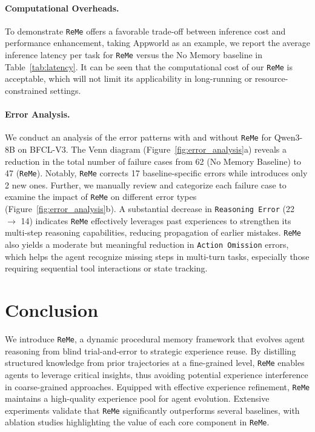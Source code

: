 \documentclass[11pt]{article}
\newcommand{\ours}{\texttt{ReMe}}
\begin{document}
\paragraph{Computational Overheads.}
To demonstrate {\ours} offers a favorable trade-off between inference cost and performance enhancement, taking Appworld as an example, we report the average inference latency per task for {\ours} versus the No Memory baseline in Table~\ref{tab:latency}. 
It can be seen that the computational cost of our {\ours} is acceptable, which will not limit its applicability in long-running or resource-constrained settings. 


\paragraph{Error Analysis.} 
We conduct an analysis of the error patterns with and without {\ours} for Qwen3-8B on BFCL-V3. 
The Venn diagram (Figure~\ref{fig:error_analysis}a) reveals a reduction in the total number of failure cases from 62 (No Memory Baseline) to 47 ({\ours}). 
Notably, {\ours} corrects 17 baseline-specific errors while introduces only 2 new ones. 
Further, we manually review and categorize each failure case to examine the impact of {\ours} on different error types (Figure~\ref{fig:error_analysis}b). 
A substantial decrease in \texttt{Reasoning Error} (22 $\rightarrow$ 14) indicates {\ours} effectively leverages past experiences to strengthen its multi‑step reasoning capabilities, reducing propagation of earlier mistakes. 
{\ours} also yields a moderate but meaningful reduction in \texttt{Action Omission} errors, which helps the agent recognize missing steps in multi-turn tasks, especially those requiring sequential tool interactions or state tracking.


\section{Conclusion}
We introduce {\ours}, a dynamic procedural memory framework that evolves agent reasoning from blind trial-and-error to strategic experience reuse. 
By distilling structured knowledge from prior trajectories at a fine-grained level, {\ours} enables agents to leverage critical insights, thus avoiding potential experience interference in coarse-grained approaches. 
Equipped with effective experience refinement, {\ours} maintains a high-quality experience pool for agent evolution. 
Extensive experiments validate that {\ours} significantly outperforms several baselines, with ablation studies highlighting the value of each core component in {\ours}. 
\end{document}
